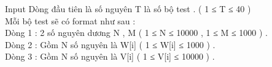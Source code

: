 Input
Dòng đầu tiên là số nguyên T là số bộ test . ( 1 ≤ T ≤ 40 )
\\Mỗi bộ test sẽ có format như sau :
\\Dòng 1 : 2 số nguyên dương N , M ( 1 ≤ N ≤ 10000 , 1 ≤ M ≤ 1000 ) .
\\Dòng 2 : Gồm N số nguyên là W[i] ( 1 ≤ W[i] ≤ 1000 ) .
\\Dòng 3 : Gồm N số nguyên là V[i] ( 1 ≤ V[i] ≤ 10000 ) .